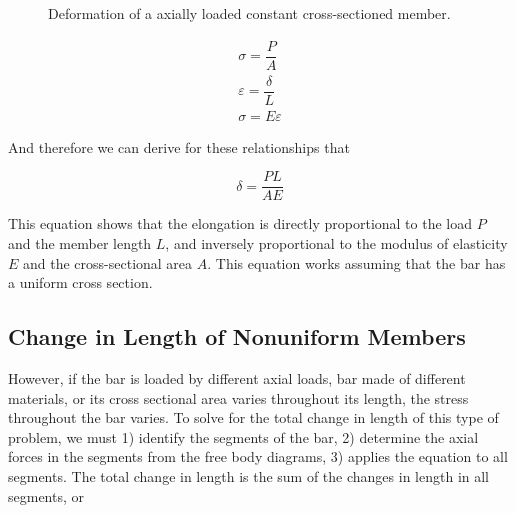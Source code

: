 \documentclass[
fontsize=10pt,
a4paper,
twosides=false,
open=any,
svgnames,
]{kaobook} %
\begin{document}
\begin{figure}[h]
  \centering
  \caption{Deformation of a axially loaded constant cross-sectioned member.}
\end{figure}

\begin{gather}
 \sigma      = \dfrac{P}{A} \\
 \varepsilon = \dfrac{\delta}{L} \\
 \sigma      = E\varepsilon 
\end{gather}

And therefore we can derive for these relationships that

\begin{equation}
  \delta  = \frac{PL}{AE}
\end{equation}

This equation shows that the elongation is directly proportional to the load $P$ and the member length $L$, and inversely proportional to the modulus of elasticity $E$ and the cross-sectional area $A$. This equation works assuming that the bar has a uniform cross section.

\subsection{Change in Length of Nonuniform Members}

However, if the bar is loaded by different axial loads, bar made of different materials, or its cross sectional area varies throughout its length, the stress throughout the bar varies. To solve for the total change in length of this type of problem, we must 1) identify the segments of the bar, 2) determine the axial forces in the segments from the free body diagrams, 3) applies the equation to all segments. The total change in length is the sum of the changes in length in all segments, or
\end{document}
